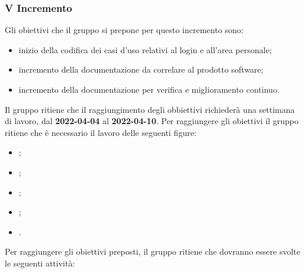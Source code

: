 \subsubsection{V Incremento}
Gli obiettivi che il gruppo si prepone per questo incremento sono:
\begin{itemize}
	\item inizio  della codifica dei casi d'uso relativi al login e all'area personale;
 	\item incremento della documentazione da correlare al prodotto software;
	\item incremento della documentazione per verifica e miglioramento continuo.
\end{itemize}
Il gruppo ritiene che il raggiungimento degli obbiettivi richiederà una settimana di lavoro, dal \textbf{2022-04-04} al \textbf{2022-04-10}.
Per raggiungere gli obiettivi il gruppo ritiene che è necessario il lavoro delle seguenti figure:
\begin{itemize}
	\item \RE{};
 	\item \AM{};
   	\item \PT{};
    \item \PR{};
   	\item \VE{}.
\end{itemize}
Per raggiungere gli obiettivi preposti, il gruppo ritiene che dovranno essere svolte le seguenti attività:
